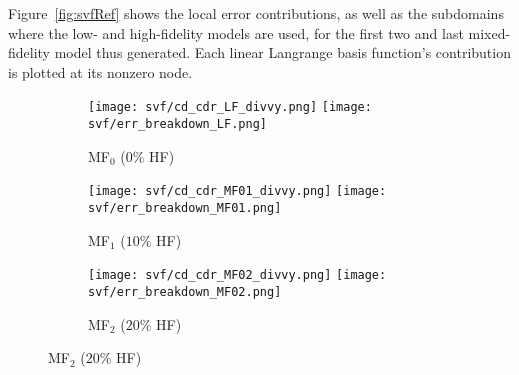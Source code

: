 Figure~\ref{fig:svfRef} shows the local error contributions, as well as the subdomains where the low- and high-fidelity models are used, for the first two and last mixed-fidelity model thus generated. Each linear Langrange basis function's contribution is plotted at its nonzero node. 
%
\begin{figure}[h!]
\captionsetup[subfigure]{justification=centering,aboveskip=-10pt}
\centering
\begin{subfigure}[b]{\textwidth}
\centering
	\texttt{[image: svf/cd\_cdr\_LF\_divvy.png]}
  \texttt{[image: svf/err\_breakdown\_LF.png]}
  \vspace{-0.7\baselineskip}
  \caption{MF$_0$ ($0\%$ HF)}
  \vspace{0.8\baselineskip}
\end{subfigure}
\begin{subfigure}[b]{\textwidth}
	\centering
	\texttt{[image: svf/cd\_cdr\_MF01\_divvy.png]}
  \texttt{[image: svf/err\_breakdown\_MF01.png]}
  \vspace{-0.7\baselineskip}
  \caption{MF$_1$ ($10\%$ HF)}
  \vspace{0.8\baselineskip}
\end{subfigure}
\begin{subfigure}[b]{\textwidth}
  \centering
  \texttt{[image: svf/cd\_cdr\_MF02\_divvy.png]}
  \texttt{[image: svf/err\_breakdown\_MF02.png]}
  \vspace{-0.7\baselineskip}
  \caption{MF$_2$ ($20\%$ HF)}
  \vspace{0.8\baselineskip}
\end{subfigure}

\end{figure}
